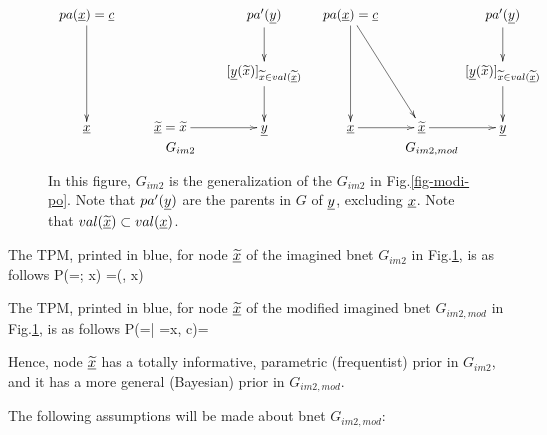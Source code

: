 \begin{figure}[h!]
$$
\begin{array}{cc}
\xymatrix{
pa(\rvx) =\rvc
\ar[dd]
&
&pa'(\rvy)\ar[d]
\\
&&[\rvy(\tilx)]_{\tilx\in val(\ul{\tilx})}\ar[d]
\\
\rvx
&\ul{\tilx}=\tilx\ar[r]
&\rvy
}
&
\xymatrix{
pa(\rvx)=\rvc
\ar[dd]\ar[ddr]
&
&pa'(\rvy)\ar[d]
\\
&&[\rvy(\tilx)]_{\tilx\in val(\ul{\tilx})}\ar[d]
\\
\rvx\ar[r]
&\ul{\tilx}\ar[r]
&\rvy
}
\\
G_{im2}
 &G_{im2,mod}
\end{array}
$$
\caption{In this figure, $G_{im2}$
is the generalization of the $G_{im2}$
in Fig.\ref{fig-modi-po}.
Note that $pa'(\rvy)$ are the parents in $G$ of
$\rvy$, excluding $\rvx$.
Note that $val(\ul{\tilx})\subset val(\rvx)$. }
\label{fig-unmodi-modi}
\end{figure}

The TPM, printed in  blue, for node $\ul{\tilx}$
of the imagined bnet $G_{im2}$ in Fig.\ref{fig-unmodi-modi}, is as follows
\beq\color{blue}
P(\ul{\tilx}=\tilx; x) =\delta(\tilx, x)
\eeq

The TPM, printed in  blue, for node $\ul{\tilx}$
of the modified imagined bnet $G_{im2,mod}$ in Fig.\ref{fig-unmodi-modi},
 is as follows
\beq\color{blue}
P(\ul{\tilx}=\tilx | \rvx=x, c)= 
\eeq

Hence, node $\ul{\tilx}$
has a totally informative, parametric (frequentist) prior in $G_{im2}$,
and it has a more general (Bayesian) prior in $G_{im2,mod}$.

The following
assumptions will
be made about bnet $G_{im2, mod}$:

